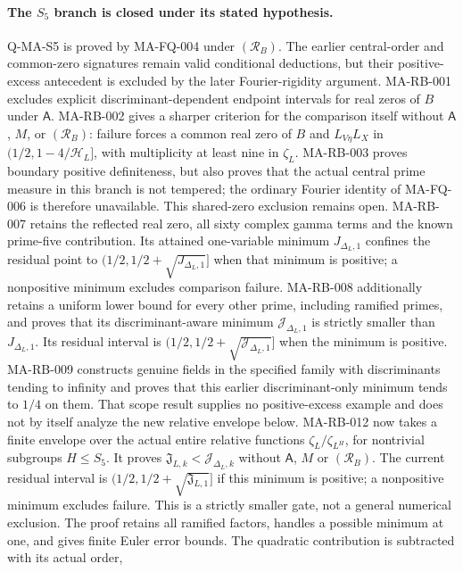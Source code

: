 \documentclass[11pt,a4paper]{article}
\begin{document}
\paragraph{The $S_5$ branch is closed under its stated hypothesis.}
Q-MA-S5 is proved by MA-FQ-004 under $(\mathcal R_B)$.
The earlier central-order and common-zero signatures remain
valid conditional deductions, but their positive-excess
antecedent is excluded by the later Fourier-rigidity argument.
MA-RB-001 excludes explicit discriminant-dependent endpoint
intervals for real zeros of $B$ under $\mathsf A$.
MA-RB-002 gives a sharper criterion for the comparison itself
without $\mathsf A$, $M$, or $(\mathcal R_B)$: failure forces a
common real zero of $B$ and $L_{V\eta}L_X$ in
$(1/2,1-4/\mathcal H_L]$, with multiplicity at least nine in
$\zeta_L$. MA-RB-003 proves boundary positive definiteness, but
also proves that the actual central prime measure in this branch
is not tempered; the ordinary Fourier identity of MA-FQ-006 is
therefore unavailable. This shared-zero exclusion remains open.
MA-RB-007 retains the reflected real zero, all sixty complex
gamma terms and the known prime-five contribution. Its attained
one-variable minimum $J_{\Delta_L,1}$ confines the residual
point to $(1/2,1/2+\sqrt{J_{\Delta_L,1}}]$ when that minimum
is positive; a nonpositive minimum excludes comparison failure.
MA-RB-008 additionally retains a uniform lower bound for every
other prime, including ramified primes, and proves that its
discriminant-aware minimum $\mathcal J_{\Delta_L,1}$ is strictly
smaller than $J_{\Delta_L,1}$. Its residual interval is
$(1/2,1/2+\sqrt{\mathcal J_{\Delta_L,1}}]$ when the minimum
is positive. MA-RB-009 constructs genuine fields in the specified
family with discriminants tending to infinity and proves that
this earlier discriminant-only minimum tends to $1/4$ on them.
That scope result supplies no positive-excess example and does
not by itself analyze the new relative envelope below.
MA-RB-012 now takes a finite envelope over the actual entire
relative functions $\zeta_L/\zeta_{L^H}$, for nontrivial
subgroups $H\le S_5$. It proves
$\mathfrak J_{L,k}<\mathcal J_{\Delta_L,k}$ without
$\mathsf A$, $M$ or $(\mathcal R_B)$. The current residual
interval is $(1/2,1/2+\sqrt{\mathfrak J_{L,1}}]$ if this
minimum is positive; a nonpositive minimum excludes failure.
This is a strictly smaller gate, not a general numerical
exclusion. The proof retains all ramified factors, handles a
possible minimum at one, and gives finite Euler error bounds.
The quadratic contribution is subtracted with its actual order,
\end{document}
